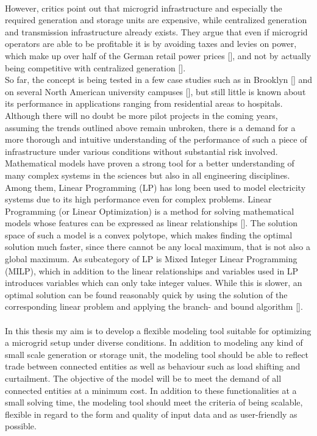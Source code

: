 \documentclass[
	11pt,								%
	DIV10,								%
	a4paper,         					%
	oneside,							%
	headheight=20pt,					%
	footheight=20pt,					%
    parskip=full,						%
    listof=totoc,						%
	bibliography=totoc,					%
	index=totoc,						%
]{scrartcl}
\begin{document}
\\
However, critics point out that microgrid infrastructure and especially the required generation and storage units are expensive, while centralized generation and transmission infrastructure already exists. They argue that even if microgrid operators are able to be profitable it is by avoiding taxes and levies on power, which make up over half of the German retail power prices [\cite{Monitoringbericht20182018}], and not by actually being competitive with centralized generation [\cite{heindlIstEnergiewendeSozial2014}].
\\
So far, the concept is being tested in a few case studies such as in Brooklyn [\cite{mengelkampDesigningMicrogridEnergy2018}] and on several North American university campuses [\cite{chenowethRiseUniversityMicrogrids2018}], but still little is known about its performance in applications ranging from residential areas to hospitals.
\\
Although there will no doubt be more pilot projects in the coming years, assuming the trends outlined above remain unbroken, there is a demand for a more thorough and intuitive understanding of the performance of such a piece of infrastructure under various conditions without substantial risk involved.
\\
Mathematical models have proven a strong tool for a better understanding of many complex systems in the sciences but also in all engineering disciplines. Among them, Linear Programming (LP) has long been used to model electricity systems due to its high performance even for complex problems. Linear Programming (or Linear Optimization) is a method for solving mathematical models whose features can be expressed as linear relationships [\cite{goodarziLinearOptimization2014}]. The solution space of such a model is a convex polytope, which makes finding the optimal solution much faster, since there cannot be any local maximum, that is not also a global maximum. As subcategory of LP is Mixed Integer Linear Programming (MILP), which in addition to the linear relationships and variables used in LP introduces variables which can only take integer values. While this is slower, an optimal solution can be found reasonably quick by using the solution of the corresponding linear problem and applying the branch- and bound algorithm [\cite{MixedIntegerProgrammingMIP2018}]. 
\\\\
In this thesis my aim is to develop a flexible modeling tool suitable for optimizing a microgrid setup under diverse conditions. In addition to modeling any kind of small scale generation or storage unit, the modeling tool should be able to reflect trade between connected entities as well as behaviour such as load shifting and curtailment. The objective of the model will be to meet the demand of all connected entities at a minimum cost. In addition to these functionalities at a small solving time, the modeling tool should meet the criteria of being scalable, flexible in regard to the form and quality of input data and as user-friendly as possible.\\
\end{document}
